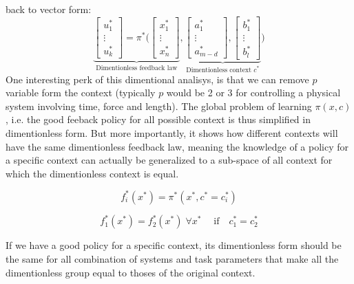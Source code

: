 back to vector form:
\begin{equation}
\underbrace{
\begin{bmatrix}
u_1^* \\
\vdots \\
u_k^*
\end{bmatrix}
=
\pi^* \Biggl(
\begin{bmatrix}
x_1^* \\
\vdots \\
x_n^*
\end{bmatrix}
}_{\text{Dimentionless feedback law}}
,
\underbrace{
\begin{bmatrix}
a_1^* \\
\vdots \\
a_{m-d}^*
\end{bmatrix}
,
\begin{bmatrix}
b_1^* \\
\vdots \\
b_l^*
\end{bmatrix}
}_{\text{Dimentionless context $c^*$}}
\Biggr)
\end{equation}
One interesting perk of this dimentional analisys, is that we can remove $p$ variable form the context (typically $p$ would be 2 or 3 for controlling a physical system involving time, force and length). The global problem of learning $\pi(x,c)$, i.e. the good feeback policy for all possible context is thus simplified in dimentionless form. But more importantly, it shows how different contexts will have the same dimentionless feedback law, meaning the knowledge of a policy for a specific context can actually be generalized to a sub-space of all context for which the dimentionless context is equal.

\begin{equation}
f_i^*(x^*) = \pi^*( x^* , c^* = c_i^*)
\end{equation}

\begin{equation}
f_1^*(x^*) = f_2^*(x^*) \; \forall x^* \; \quad \text{if} \quad c_1^* = c_2^*
\end{equation}

If we have a good policy for a specific context, its dimentionless form should be the same for all combination of systems and task parameters that make all the dimentionless group equal to thoses of the original context. 


